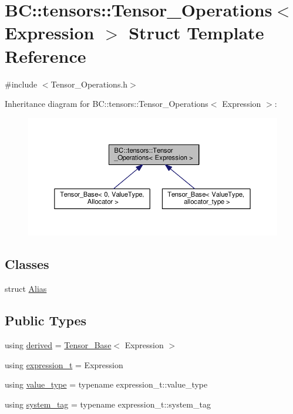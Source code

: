 \hypertarget{structBC_1_1tensors_1_1Tensor__Operations}{}\section{BC\+:\+:tensors\+:\+:Tensor\+\_\+\+Operations$<$ Expression $>$ Struct Template Reference}
\label{structBC_1_1tensors_1_1Tensor__Operations}


{\ttfamily \#include $<$Tensor\+\_\+\+Operations.\+h$>$}



Inheritance diagram for BC\+:\+:tensors\+:\+:Tensor\+\_\+\+Operations$<$ Expression $>$\+:
\nopagebreak
\begin{figure}[H]
\begin{center}
\leavevmode
\includegraphics[width=350pt]{structBC_1_1tensors_1_1Tensor__Operations__inherit__graph}
\end{center}
\end{figure}
\subsection*{Classes}
\begin{DoxyCompactItemize}
\item 
struct \hyperlink{structBC_1_1tensors_1_1Tensor__Operations_1_1Alias}{Alias}
\end{DoxyCompactItemize}
\subsection*{Public Types}
\begin{DoxyCompactItemize}
\item 
using \hyperlink{structBC_1_1tensors_1_1Tensor__Operations_a830b9a11262226b18af9caef7b9da13b}{derived} = \hyperlink{classBC_1_1tensors_1_1Tensor__Base}{Tensor\+\_\+\+Base}$<$ Expression $>$
\item 
using \hyperlink{structBC_1_1tensors_1_1Tensor__Operations_a963cb506586200de946d7f3c9a02c56d}{expression\+\_\+t} = Expression
\item 
using \hyperlink{structBC_1_1tensors_1_1Tensor__Operations_a05713745a836002a261c16e032629aa8}{value\+\_\+type} = typename expression\+\_\+t\+::value\+\_\+type
\item 
using \hyperlink{structBC_1_1tensors_1_1Tensor__Operations_aeb2358dba2e022c48d925342d4bc34a2}{system\+\_\+tag} = typename expression\+\_\+t\+::system\+\_\+tag
\end{DoxyCompactItemize}
